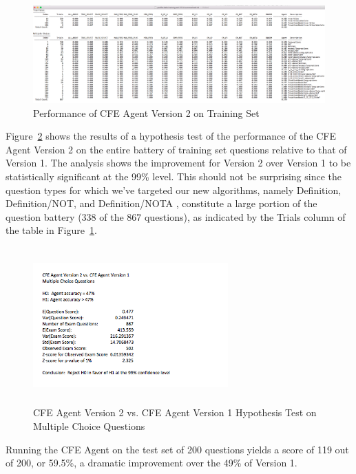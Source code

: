 \begin{figure}
\centering
\vspace{0.25in}
\includegraphics[width=\textwidth]{version_2_training_set_performance.png}
\caption{Performance of CFE Agent Version 2 on Training Set}
\label{fig:version_2_training_set_performance}
\end{figure}

Figure~\ref{fig:version_2_multiple_choice_hypothesis_test} shows the results of a hypothesis test of the performance of the CFE Agent Version 2 on the entire battery of training set questions relative to that of Version 1.  The analysis shows the improvement for Version 2 over Version 1 to be statistically significant at the 99\% level.  This should not be surprising since the question types for which we've targeted our new algorithms, namely Definition, Definition/NOT, and Definition/NOTA , constitute a large portion of the question battery (338 of the 867 questions), as indicated by the Trials column of the table in Figure~\ref{fig:version_2_training_set_performance}.

\begin{figure}
\centering
\vspace{0.75in}
\includegraphics[width=75mm, height=60mm]{version_2_multiple_choice_hypothesis_test.png}
\caption{CFE Agent Version 2 vs. CFE Agent Version 1 Hypothesis Test on Multiple Choice Questions}
\label{fig:version_2_multiple_choice_hypothesis_test}
\end{figure}

Running the CFE Agent on the test set of 200 questions yields a score of 119 out of 200, or 59.5\%, a dramatic improvement over the 49\% of Version 1.

















